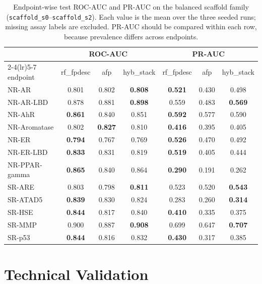 \documentclass[conference]{IEEEtran}
\newcommand{\code}[1]{\texttt{\small #1}}
\begin{document}
\begin{table}[t]
\centering
\caption{Endpoint-wise test ROC-AUC and PR-AUC on the balanced scaffold family
(\code{scaffold\_s0}--\code{scaffold\_s2}). Each value is the mean over the three seeded runs;
missing assay labels are excluded. PR-AUC should be compared within each row, because prevalence
differs across endpoints.}
\label{tab:endpoint}
\small
\begin{tabular}{lcccccc}
\toprule
 & \multicolumn{3}{c}{ROC-AUC} & \multicolumn{3}{c}{PR-AUC} \\
\cmidrule(lr){2-4}\cmidrule(lr){5-7}
endpoint & rf\_fpdesc & afp & hyb\_stack & rf\_fpdesc & afp & hyb\_stack \\
\midrule
NR-AR & 0.801 & 0.802 & \textbf{0.808} & \textbf{0.521} & 0.430 & 0.498 \\
NR-AR-LBD & 0.878 & 0.881 & \textbf{0.898} & 0.559 & 0.483 & \textbf{0.569} \\
NR-AhR & \textbf{0.861} & 0.840 & 0.851 & \textbf{0.592} & 0.577 & 0.590 \\
NR-Aromatase & 0.802 & \textbf{0.827} & 0.810 & \textbf{0.416} & 0.395 & 0.405 \\
NR-ER & \textbf{0.794} & 0.767 & 0.769 & \textbf{0.526} & 0.470 & 0.492 \\
NR-ER-LBD & \textbf{0.833} & 0.831 & 0.819 & \textbf{0.519} & 0.405 & 0.444 \\
NR-PPAR-gamma & \textbf{0.865} & 0.840 & 0.864 & \textbf{0.290} & 0.191 & 0.262 \\
SR-ARE & 0.803 & 0.798 & \textbf{0.811} & 0.523 & 0.520 & \textbf{0.543} \\
SR-ATAD5 & \textbf{0.839} & 0.830 & 0.824 & 0.283 & 0.260 & \textbf{0.314} \\
SR-HSE & \textbf{0.844} & 0.817 & 0.840 & \textbf{0.410} & 0.335 & 0.375 \\
SR-MMP & 0.900 & 0.887 & \textbf{0.908} & 0.699 & 0.647 & \textbf{0.707} \\
SR-p53 & \textbf{0.844} & 0.816 & 0.832 & \textbf{0.430} & 0.317 & 0.385 \\
\bottomrule
\end{tabular}
\end{table}

\section{Technical Validation}
\label{sec:validation}
\end{document}
